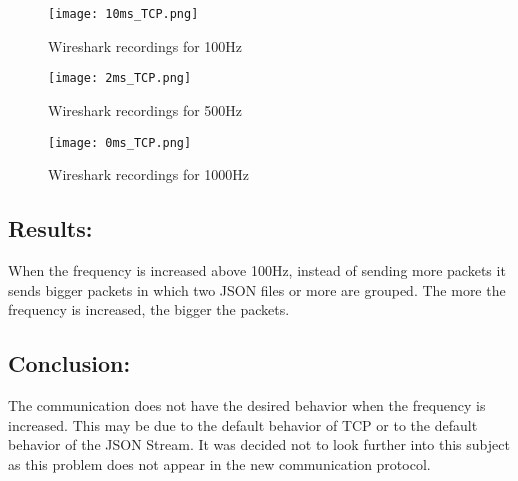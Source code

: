 	\begin{figure}[h]
		\centering
		\texttt{[image: 10ms\_TCP.png]}
		\caption{Wireshark recordings for 100Hz}
		\label{fig:10ms_tcp}
	\end{figure}
	\begin{figure}[h]
		\centering
		\texttt{[image: 2ms\_TCP.png]}
		\caption{Wireshark recordings for 500Hz}
		\label{fig:2ms_tcp}
	\end{figure}
	\begin{figure}[h]
		\centering
		\texttt{[image: 0ms\_TCP.png]}
		\caption{Wireshark recordings for 1000Hz}
		\label{fig:0ms_tcp}
	\end{figure}


\subsection*{Results:}

When the frequency is increased above 100Hz, instead of sending more packets it sends bigger packets in which two \gls{JSON} files or more are grouped. The more the frequency is increased, the bigger the packets. 

\subsection*{Conclusion:}

The communication does not have the desired behavior when the frequency is increased. This may be due to the default behavior of TCP or to the default behavior of the JSON Stream. It was decided not to look further into this subject as this problem does not appear in the new communication protocol.